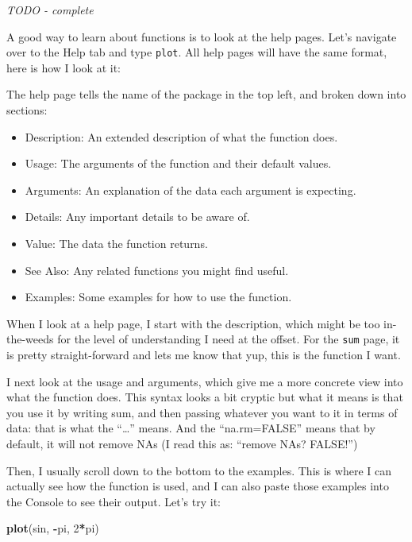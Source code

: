 \documentclass[]{book}
\newenvironment{Shaded}{\begin{snugshade}}{\end{snugshade}}
\newcommand{\DecValTok}[1]{\textcolor[rgb]{0.00,0.00,0.81}{#1}}
\newcommand{\KeywordTok}[1]{\textcolor[rgb]{0.13,0.29,0.53}{\textbf{#1}}}
\newcommand{\NormalTok}[1]{#1}
\newcommand{\OperatorTok}[1]{\textcolor[rgb]{0.81,0.36,0.00}{\textbf{#1}}}
\providecommand{\tightlist}{%
  \setlength{\itemsep}{0pt}\setlength{\parskip}{0pt}}
\begin{document}
\emph{TODO - complete}

A good way to learn about functions is to look at the help pages. Let's navigate over to the Help tab and type \texttt{plot}. All help pages will have the same format, here is how I look at it:

The help page tells the name of the package in the top left, and broken down into sections:

\begin{itemize}
\tightlist
\item
  Description: An extended description of what the function does.
\item
  Usage: The arguments of the function and their default values.
\item
  Arguments: An explanation of the data each argument is expecting.
\item
  Details: Any important details to be aware of.
\item
  Value: The data the function returns.
\item
  See Also: Any related functions you might find useful.
\item
  Examples: Some examples for how to use the function.
\end{itemize}

When I look at a help page, I start with the description, which might be too in-the-weeds for the level of understanding I need at the offset. For the \texttt{sum} page, it is pretty straight-forward and lets me know that yup, this is the function I want.

I next look at the usage and arguments, which give me a more concrete view into what the function does. This syntax looks a bit cryptic but what it means is that you use it by writing sum, and then passing whatever you want to it in terms of data: that is what the ``\ldots{}'' means. And the ``na.rm=FALSE'' means that by default, it will not remove NAs (I read this as: ``remove NAs? FALSE!'')

Then, I usually scroll down to the bottom to the examples. This is where I can actually see how the function is used, and I can also paste those examples into the Console to see their output. Let's try it:

\begin{Shaded}
\begin{Highlighting}[]
\KeywordTok{plot}\NormalTok{(sin, }\OperatorTok{-}\NormalTok{pi, }\DecValTok{2}\OperatorTok{*}\NormalTok{pi)}
\end{Highlighting}
\end{Shaded}
\end{document}
